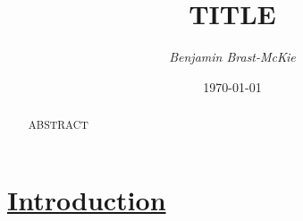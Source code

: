 \documentclass[11pt]{article} %
\newcommand{\hypsection}[1]{\section[#1]{\hyperlink{toc}{#1}}} %
\theoremstyle{theorem}
\theoremstyle{Lthm}
\theoremstyle{Pthm}
\begin{document}
\title{\sc TITLE} %
\author{\it Benjamin Brast-McKie} 
\date{\today}
\maketitle
\thispagestyle{empty}


\begin{abstract}
\noindent
ABSTRACT
\end{abstract}




\hypsection{Introduction}\label{Intro}

















\newpage
\begin{footnotesize} %
\singlespacing %
\setlength{\bibsep}{5pt} %
\thispagestyle{empty} %
\end{footnotesize} %
\end{document}
